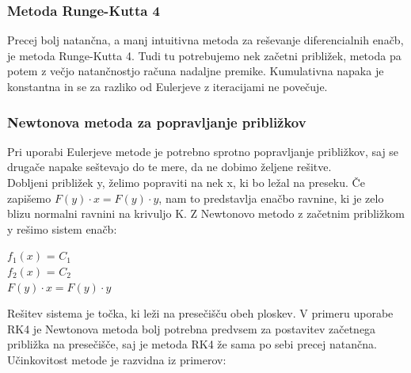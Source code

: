 \documentclass[12pt]{article}
\begin{document}
	
	\subsubsection{Metoda Runge-Kutta 4}
	Precej bolj natančna, a manj intuitivna metoda za reševanje diferencialnih enačb, je metoda Runge-Kutta 4. Tudi tu potrebujemo nek začetni približek, metoda pa potem z večjo natančnostjo računa nadaljne premike. Kumulativna napaka je konstantna in se za razliko od Eulerjeve z iteracijami ne povečuje.
	
	\subsubsection{Newtonova metoda za popravljanje približkov}
	Pri uporabi Eulerjeve metode je potrebno sprotno popravljanje približkov, saj se drugače napake seštevajo do te mere, da ne dobimo željene rešitve.\\
	Dobljeni približek y, želimo popraviti na nek x, ki bo ležal na preseku. Če zapišemo $F(y) \cdot x = F(y)\cdot y $, nam to predstavlja enačbo ravnine, ki je zelo blizu normalni ravnini na krivuljo K. Z Newtonovo metodo z začetnim približkom y rešimo sistem enačb:
	\begin{center}
		$f_{1}(x)$ = $C_{1}$\\$f_{2}(x)$ = $C_{2}$\\ $F(y) \cdot x = F(y)\cdot y $
	\end{center}
	Rešitev sistema je točka, ki leži na presečišču obeh ploskev. V primeru uporabe RK4 je Newtonova metoda bolj potrebna predvsem za postavitev začetnega približka na presečišče, saj je metoda RK4 že sama po sebi precej natančna. Učinkovitost metode je razvidna iz primerov:
	
\end{document}
